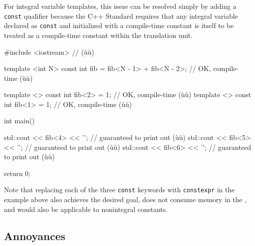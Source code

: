 \enlargethispage*{2ex}
\noindent For integral variable templates, this issue can be resolved simply by adding a \lstinline!const! qualifier because the C++ Standard requires that any integral variable declared as \lstinline!const! and initialized with a compile-time constant is itself to be treated as a compile-time constant within the translation unit.

\begin{emcppslisting}
#include <iostream>  // (ù{}ù)

template <int N>
const int fib = fib<N - 1> + fib<N - 2>;  // OK, compile-time (ù{}ù)

template <> const int fib<2> = 1;         // OK, compile-time (ù{}ù)
template <> const int fib<1> = 1;         // OK, compile-time (ù{}ù)

int main()
{
    std::cout << fib<4> << '\n';  // guaranteed to print out (ù{}ù)
    std::cout << fib<5> << '\n';  // guaranteed to print out (ù{}ù)
    std::cout << fib<6> << '\n';  // guaranteed to print out (ù{}ù)

    return 0;
}
\end{emcppslisting}

\noindent Note that replacing each of the three \lstinline!const! keywords with
\lstinline!constexpr! in the example above also achieves the
desired goal, does not consume memory in the , and would also be applicable to nonintegral constants.

\subsection[Annoyances]{Annoyances}\label{annoyances}

